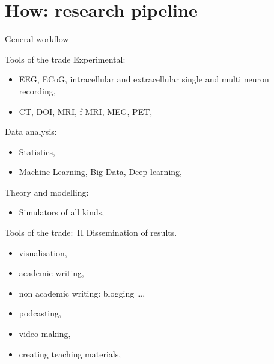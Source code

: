 \section{How: research pipeline}
\begin{frame}[c]{General workflow}
  \begin{figure}[h]
    \centering
  \end{figure}
\end{frame}
\begin{frame}[c]{Tools of the trade}
  \textcolor{FedoraBlue}{Experimental:}
    \begin{itemize}
      \item EEG, ECoG, intracellular and extracellular single and multi neuron recording,
      \item CT, DOI, MRI, f-MRI, MEG, PET,
    \end{itemize}
    \pause{}
  \textcolor{FriendsMagenta}{Data analysis:}
    \begin{itemize}
      \item Statistics,
      \item Machine Learning, Big Data, Deep learning,
    \end{itemize}
    \pause{}
  \textcolor{FeaturesOrange}{Theory} and \textcolor{FirstGreen}{modelling:}
    \begin{itemize}
      \item Simulators of all kinds, 
    \end{itemize}
\end{frame}
\begin{frame}[c]{Tools of the trade:\ II}
  \textcolor{FedoraDarkBlue}{Dissemination of results\footnotemark[4].}
  \begin{itemize}
    \item visualisation,
    \item academic writing,
    \item non academic writing: blogging \ldots,
    \item podcasting,
    \item video making,
    \item creating teaching materials,
  \end{itemize}
\end{frame}
